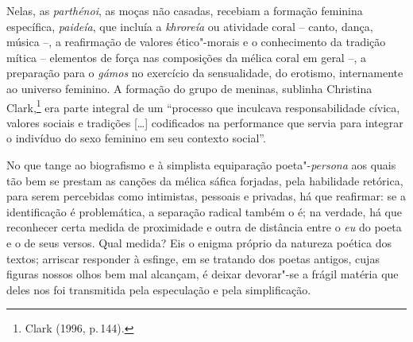 Nelas, as \textit{parthénoi}, as moças não casadas, recebiam a formação feminina específica, \textit{paideía}, que incluía a \textit{khroreía} ou atividade coral -- canto, dança, música --, a reafirmação de valores ético"-morais e o conhecimento da tradição mítica -- elementos de força nas composições da mélica coral em geral --, a preparação para o \textit{gámos} no exercício da sensualidade, do erotismo, internamente ao universo feminino. A formação do grupo de meninas, sublinha Christina Clark,\footnote{Clark (1996, p.\,144).} era parte integral de um “processo que inculcava responsabilidade cívica, valores sociais e tradições [\ldots{}] codificados na performance que servia para integrar o indivíduo do sexo feminino em seu contexto social”.


No que tange ao biografismo e à simplista equiparação poeta"-\textit{persona} aos quais tão bem se prestam as canções da mélica sáfica forjadas, pela habilidade retórica, para serem percebidas como intimistas, pessoais e privadas, há que reafirmar: se a identificação é problemática,
a separação radical também o é; na verdade, há que reconhecer certa medida de
proximidade e outra de distância entre o \textit{eu} do poeta e o de seus versos. Qual
medida? Eis o enigma próprio da natureza poética dos textos; arriscar
responder à esfinge, em se tratando dos poetas antigos, cujas figuras nossos
olhos bem mal alcançam, é deixar devorar"-se a frágil matéria que deles nos foi
transmitida pela especulação e pela simplificação.

